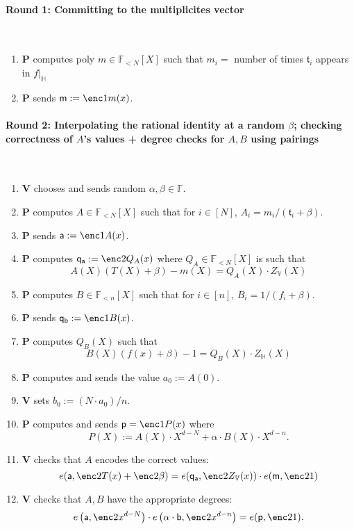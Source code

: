 \documentclass[11pt]{article} %
\newcommand{\F}{\ensuremath{\mathbb F}\xspace}
\newcommand{\defeq}{:=}
\newcommand{\prv}{\ensuremath{\mathsf{\mathbf{P}}}\xspace}
\newcommand{\ver}{\ensuremath{\mathsf{\mathbf{V}}}\xspace}
\newcommand{\polysofdeg}[1]{\ensuremath{\F_{< #1}[X]}\xspace}
\newcommand{\restricttoset}[2]{\ensuremath{#1|_{#2}}\xspace}
\newcommand{\subspace}{\ensuremath{\mathbb{H}}\xspace}
\newcommand{\bigspace}{\ensuremath{\mathbb{V}}\xspace}
\newcommand{\witsize}{\ensuremath{n}\xspace}
\newcommand{\tabsize}{\ensuremath{N}\xspace}
\newcommand{\tab}{\ensuremath{\mathfrak{t}}\xspace}
\renewcommand{\a}{\ensuremath{\mathsf{a}}\xspace}
\renewcommand{\b}{\ensuremath{\mathsf{b}}\xspace}
\renewcommand{\p}{\ensuremath{\mathsf{p}}\xspace}
\newcommand{\qa}{\ensuremath{\mathsf{q_a}}\xspace}
\newcommand{\qb}{\ensuremath{\mathsf{q_b}}\xspace}
\newcommand{\m}{\ensuremath{\mathsf{m}}\xspace}
\begin{document}
	\paragraph{\textbf{Round 1:} Committing to the multiplicites vector} \ \\
\begin{enumerate}
 \item \prv computes poly $m\in \polysofdeg{\tabsize}$ such that $m_i=$ number of times $\tab_i$ appears in \restricttoset{f}{\subspace}
 \item \prv sends $\m\defeq \enc1{m(x)}$.
 \end{enumerate}
	\paragraph{\textbf{Round 2:} Interpolating the rational identity at a random $\beta$; checking correctness of  $A$'s values + degree checks for $A,B$ using pairings} \ \\
 
\begin{enumerate}
 \item \ver chooses and sends random $\alpha,\beta \in \F$.
\item \prv computes $A\in \polysofdeg{\tabsize}$ such that for $i\in [\tabsize]$, $A_i = m_i/(\tab_i+\beta)$.
\item \prv sends $\a\defeq \enc1{A(x)}$.
\item\label{step:computeQA} \prv computes $\qa \defeq \enc2{Q_A(x)}$ where $Q_A\in \polysofdeg{\tabsize}$ is such that 
\[A(X)(T(X)+\beta)-m(X)= Q_A(X)\cdot Z_\bigspace(X)\]
\item \prv computes $B\in \polysofdeg{\witsize}$ such that for $i\in [\witsize]$, $B_i=1/(f_i+\beta)$.
\item \prv sends $\qb\defeq \enc1{B(x)}$.
\item \prv computes $Q_B(X)$ such that 
\[B(X)(f(x)+\beta)-1 = Q_B(X)\cdot Z_\subspace(X)\]
\item \prv computes and sends the value $a_0\defeq A(0)$.
\item \ver  sets $b_0\defeq (\tabsize\cdot a_0)/\witsize$.
\item \prv computes and sends $\p=\enc1{P(x)}$ where
\[P(X)\defeq A(X)\cdot X^{d-\tabsize}+\alpha\cdot B(X)\cdot X^{d-\witsize}. \]
\item\label{step:checkqa} \ver checks that $A$ encodes the correct values:
\[e(\a,\enc2{T(x)}+\enc2{\beta} )=e(\qa,\enc2{Z_\bigspace(x)})\cdot e(\m,\enc2{1})\]
\item\label{step:checkadeg} \ver checks that $A,B$ have the appropriate degrees:
\[e\left(\a,\enc2{x^{d-\tabsize}}\right)\cdot e\left(\alpha\cdot \b,\enc2{x^{d-\witsize}}\right)=e(\p,\enc2{1}).\]
 \end{enumerate}
\end{document}
